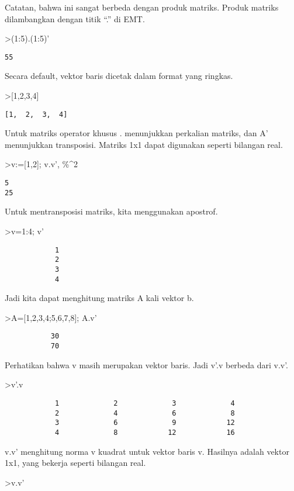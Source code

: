 \documentclass[
]{book}
\begin{document}
Catatan, bahwa ini sangat berbeda dengan produk matriks. Produk matriks dilambangkan dengan titik ``.'' di EMT.

\textgreater(1:5).(1:5)'

\begin{verbatim}
55
\end{verbatim}

Secara default, vektor baris dicetak dalam format yang ringkas.

\textgreater{[}1,2,3,4{]}

\begin{verbatim}
[1,  2,  3,  4]
\end{verbatim}

Untuk matriks operator khusus . menunjukkan perkalian matriks, dan A' menunjukkan transposisi. Matriks 1x1 dapat digunakan seperti bilangan real.

\textgreater v:={[}1,2{]}; v.v', \%\^{}2

\begin{verbatim}
5
25
\end{verbatim}

Untuk mentransposisi matriks, kita menggunakan apostrof.

\textgreater v=1:4; v'

\begin{verbatim}
            1 
            2 
            3 
            4 
\end{verbatim}

Jadi kita dapat menghitung matriks A kali vektor b.

\textgreater A={[}1,2,3,4;5,6,7,8{]}; A.v'

\begin{verbatim}
           30 
           70 
\end{verbatim}

Perhatikan bahwa v masih merupakan vektor baris. Jadi v'.v berbeda dari v.v'.

\textgreater v'.v

\begin{verbatim}
            1             2             3             4 
            2             4             6             8 
            3             6             9            12 
            4             8            12            16 
\end{verbatim}

v.v' menghitung norma v kuadrat untuk vektor baris v. Hasilnya adalah vektor 1x1, yang bekerja seperti bilangan real.

\textgreater v.v'
\end{document}
